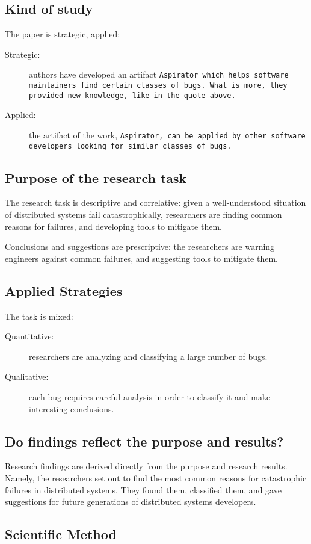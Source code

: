 \documentclass{article}
\begin{document}
\subsection{Kind of study}
The paper is strategic, applied:

\begin{description}

    \item[Strategic:] authors have developed an artifact \tt{Aspirator} which
        helps software maintainers find certain classes of bugs. What is more,
        they provided new knowledge, like in the quote above.

    \item[Applied:] the artifact of the work, \tt{Aspirator}, can be applied by
        other software developers looking for similar classes of bugs.

\end{description}

\subsection{Purpose of the research task}

The research task is descriptive and correlative: given a well-understood
situation of distributed systems fail catastrophically, researchers are finding
common reasons for failures, and developing tools to mitigate them.

Conclusions and suggestions are prescriptive: the researchers are warning
engineers against common failures, and suggesting tools to mitigate them.

\subsection{Applied Strategies}

The task is mixed:
\begin{description}
    \item[Quantitative:] researchers are analyzing and classifying a large
        number of bugs.
    \item[Qualitative:] each bug requires careful analysis in order to classify
        it and make interesting conclusions.
\end{description}

\subsection{Do findings reflect the purpose and results?}

Research findings are derived directly from the purpose and research results.
Namely, the researchers set out to find the most common reasons for
catastrophic failures in distributed systems. They found them, classified them,
and gave suggestions for future generations of distributed systems developers.

\subsection{Scientific Method}

\printbibliography
\end{document}
